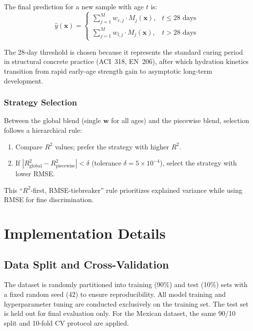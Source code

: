 \documentclass[journal]{IEEEtran}
\begin{document}
The final prediction for a new sample with age $t$ is:
\begin{equation}
\hat{y}(\mathbf{x}) = \begin{cases}
\displaystyle\sum_{j=1}^{M} w_{e,j} \cdot M_j(\mathbf{x}), & t \leq 28 \text{ days} \\[12pt]
\displaystyle\sum_{j=1}^{M} w_{l,j} \cdot M_j(\mathbf{x}), & t > 28 \text{ days}
\end{cases}
\end{equation}

The 28-day threshold is chosen because it represents the standard curing period in structural concrete practice (ACI~318, EN~206), after which hydration kinetics transition from rapid early-age strength gain to asymptotic long-term development.

\subsubsection{Strategy Selection}

Between the global blend (single $\mathbf{w}$ for all ages) and the piecewise blend, selection follows a hierarchical rule:
\begin{enumerate}
\item Compare $R^2$ values; prefer the strategy with higher $R^2$.
\item If $|R^2_{\text{global}} - R^2_{\text{piecewise}}| < \delta$ (tolerance $\delta = 5 \times 10^{-4}$), select the strategy with lower RMSE.
\end{enumerate}

This ``$R^2$-first, RMSE-tiebreaker'' rule prioritizes explained variance while using RMSE for fine discrimination.

\section{Implementation Details}

\subsection{Data Split and Cross-Validation}

The dataset is randomly partitioned into training (90\%) and test (10\%) sets with a fixed random seed (42) to ensure reproducibility. All model training and hyperparameter tuning are conducted exclusively on the training set. The test set is held out for final evaluation only. For the Mexican dataset, the same 90/10 split and 10-fold CV protocol are applied.
\end{document}
